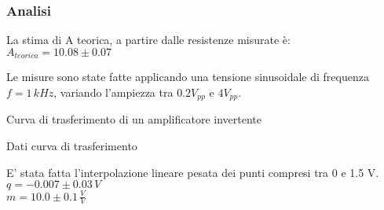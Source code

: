 \subsubsection{Analisi}
La stima di A teorica, a partire dalle resistenze misurate è:\\
$A_{teorica}=10.08 \pm 0.07$ %

Le misure sono state fatte applicando una tensione sinusoidale di frequenza $ f=1 \,kHz$, variando l'ampiezza tra 
$0.2 V_{pp}$ e $4 V_{pp}$.

\begin{grafico} 
 \centering 
  
 \caption{Curva di trasferimento di un amplificatore invertente} 
 \label{gr:amp_noninv.tex} 
\end{grafico}

\begin{tabella}
 \centering
  
 \caption{Dati curva di trasferimento}
 \label{tab:tab_non_inv.tex}
\end{tabella}

E' stata fatta l'interpolazione lineare pesata dei punti compresi tra 0 e 1.5 V.\\
$q = -0.007 \pm 0.03 \, V$\\
$m = 10.0 \pm 0.1 \,\frac{V}{V}$

